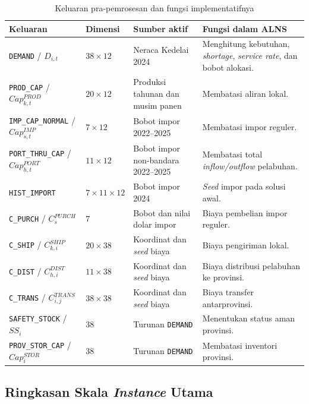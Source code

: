 \documentclass{file/TA-ITS}
\theoremstyle{definition}
\theoremstyle{definition}
\theoremstyle{plain}
\begin{document}
\begin{table}[H]
\centering
\caption{Keluaran pra-pemrosesan dan fungsi implementatifnya}
\label{tab:output_preprocessing}
\scriptsize
\begin{tabularx}{\textwidth}{@{}p{}p{}p{}X@{}}
\toprule
\textbf{Keluaran} & \textbf{Dimensi} & \textbf{Sumber aktif} & \textbf{Fungsi dalam ALNS} \\
\midrule
\texttt{DEMAND} / $D_{i,t}$ & $38 \times 12$ & Neraca Kedelai 2024 & Menghitung kebutuhan, \textit{shortage}, \textit{service rate}, dan bobot alokasi. \\
\texttt{PROD\_CAP} / $Cap^{PROD}_{k,t}$ & $20 \times 12$ & Produksi tahunan dan musim panen & Membatasi aliran lokal. \\
\texttt{IMP\_CAP\_NORMAL} / $Cap^{IMP}_{s,t}$ & $7 \times 12$ & Bobot impor 2022--2025 & Membatasi impor reguler. \\
\texttt{PORT\_THRU\_CAP} / $Cap^{PORT}_{h,t}$ & $11 \times 12$ & Bobot impor non-bandara 2022--2025 & Membatasi total \textit{inflow/outflow} pelabuhan. \\
\texttt{HIST\_IMPORT} & $7 \times 11 \times 12$ & Bobot impor 2024 & \textit{Seed} impor pada solusi awal. \\
\texttt{C\_PURCH} / $C^{PURCH}_{s}$ & $7$ & Bobot dan nilai dolar impor & Biaya pembelian impor reguler. \\
\texttt{C\_SHIP} / $C^{SHIP}_{k,i}$ & $20 \times 38$ & Koordinat dan \textit{seed} biaya & Biaya pengiriman lokal. \\
\texttt{C\_DIST} / $C^{DIST}_{h,i}$ & $11 \times 38$ & Koordinat dan \textit{seed} biaya & Biaya distribusi pelabuhan ke provinsi. \\
\texttt{C\_TRANS} / $C^{TRANS}_{i,j}$ & $38 \times 38$ & Koordinat dan \textit{seed} biaya & Biaya transfer antarprovinsi. \\
\texttt{SAFETY\_STOCK} / $SS_i$ & $38$ & Turunan \texttt{DEMAND} & Menentukan status aman provinsi. \\
\texttt{PROV\_STOR\_CAP} / $Cap^{STOR}_i$ & $38$ & Turunan \texttt{DEMAND} & Membatasi inventori provinsi. \\
\bottomrule
\end{tabularx}
\end{table}

\subsection{Ringkasan Skala \textit{Instance} Utama}
\end{document}

